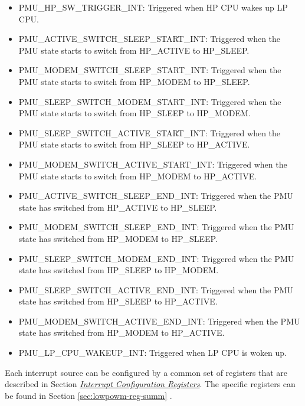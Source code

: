 \documentclass[main\_\_EN.tex]{subfiles}
\begin{document}
\begin{itemize}
\item \label{int:PMUHPSWTRIGGERINT}PMU\_HP\_SW\_TRIGGER\_INT: Triggered when HP CPU wakes up LP CPU.

\item \label{int:PMUACTIVESWITCHSLEEPSTARTINT}PMU\_ACTIVE\_SWITCH\_SLEEP\_START\_INT: Triggered when the PMU state starts to switch from HP\_ACTIVE to HP\_SLEEP.
\item \label{int:PMUMODEMSWITCHSLEEPSTARTINT}PMU\_MODEM\_SWITCH\_SLEEP\_START\_INT: Triggered when the PMU state starts to switch from HP\_MODEM to HP\_SLEEP.
\item \label{int:PMUSLEEPSWITCHMODEMSTARTINT}PMU\_SLEEP\_SWITCH\_MODEM\_START\_INT: Triggered when the PMU state starts to switch from HP\_SLEEP to HP\_MODEM.
\item \label{int:PMUSLEEPSWITCHACTIVESTARTINT}PMU\_SLEEP\_SWITCH\_ACTIVE\_START\_INT: Triggered when the PMU state starts to switch from HP\_SLEEP to HP\_ACTIVE.
\item \label{int:PMUMODEMSWITCHACTIVESTARTINT}PMU\_MODEM\_SWITCH\_ACTIVE\_START\_INT: Triggered when the PMU state starts to switch from HP\_MODEM to HP\_ACTIVE.
\item \label{int:PMUACTIVESWITCHSLEEPENDINT}PMU\_ACTIVE\_SWITCH\_SLEEP\_END\_INT: Triggered when the PMU state has switched from HP\_ACTIVE to HP\_SLEEP.
\item \label{int:PMUMODEMSWITCHSLEEPENDINT}PMU\_MODEM\_SWITCH\_SLEEP\_END\_INT: Triggered when the PMU state has switched from  HP\_MODEM to HP\_SLEEP.
\item \label{int:PMUSLEEPSWITCHMODEMENDINT}PMU\_SLEEP\_SWITCH\_MODEM\_END\_INT: Triggered when the PMU state has switched from  HP\_SLEEP to HP\_MODEM.
\item \label{int:PMUSLEEPSWITCHACTIVEENDINT}PMU\_SLEEP\_SWITCH\_ACTIVE\_END\_INT: Triggered when the PMU state has switched from HP\_SLEEP to HP\_ACTIVE.
\item \label{int:PMUMODEMSWITCHACTIVEENDINT}PMU\_MODEM\_SWITCH\_ACTIVE\_END\_INT: Triggered when the PMU state has switched from HP\_MODEM to HP\_ACTIVE.
\item \label{int:PMULPCPUWAKEUPINT}PMU\_LP\_CPU\_WAKEUP\_INT: Triggered when LP CPU is woken up.
\end{itemize}


Each interrupt source can be configured by a common set of registers that are described in Section \hyperref[interrupt-config-registers]{\textit{Interrupt Configuration Registers}}. The specific registers can be found in Section \ref{sec:lowpowm-reg-summ} \textit{}.
\end{document}
